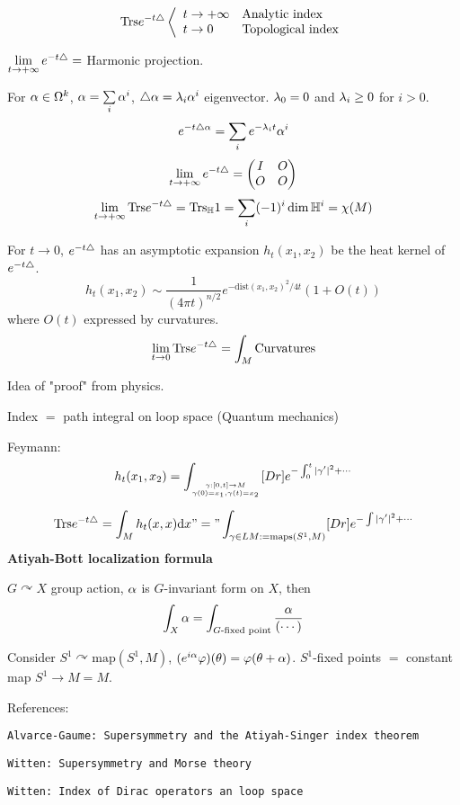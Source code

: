 $$
  \text{Trs} e^{-t\triangle}
  \left\langle
    \begin{array}{ll}
      t\to+\infty  &  \text{Analytic index}\\
      t\to 0       &  \text{Topological index}
    \end{array}
  \right.
$$

$\lim\limits_{t\to+\infty}e^{-t\triangle}=$ Harmonic projection.

For $\alpha\in\Omega^k$,
$\alpha=\sum\limits_i\alpha^i$, $\triangle\alpha=\lambda_i\alpha^i$ eigenvector.
$\lambda_0=0$ and $\lambda_i\geq 0$ for $i>0$.
$$e^{-t\triangle\alpha}=\sum_ie^{-\lambda_i t}\alpha^i$$
$$
  \lim_{t\to+\infty}
  e^{-t\triangle}
=
  \begin{pmatrix}
    I & O \\
    O & O
  \end{pmatrix}
$$
$$
  \lim_{t\to+\infty}
  \text{Trs}e^{-t\triangle}
=
  \text{Trs}_{\mathbb{H}}1
=\sum_i(-1)^i\dim\mathbb{H}^i=\chi(M)
$$

For $t\to 0$, $e^{-t\triangle}$ has an asymptotic expansion
$h_t(x_1,x_2)$ be the heat kernel of $e^{-t\triangle}$.
$$h_t(x_1,x_2)\sim\frac{1}{(4\pi t)^{n/2}}e^{-\text{dist}(x_1,x_2)^2/4t}
(1+O(t))$$
where $O(t)$ expressed by curvatures.
$$
  \lim_{t\to 0}
    \text{Trs} e^{-t\triangle}
=
  \int_M
    \text{Curvatures}
$$

Idea of "proof" from physics.

Index $=$ path integral on loop space (Quantum mechanics)

Feymann: 
$$
  h_t(x_1,x_2)
=
  \int_{\gamma:[0,t]\to M\atop \gamma(0)=x_1,\gamma(t)=x_2}
    [Dr]e^{-\int_{0}^{t}|\gamma'|^2+\cdots}
$$ 

$$
  \text{Trs} e^{-t\triangle}
=
  \int_M h_t(x,x)\mathrm{d} x
"="
  \int_{\gamma\in LM:=\text{maps}(S^1,M)}
    [Dr]
    e^{-\int |\gamma'|^2+\cdots}
$$
\textbf{Atiyah-Bott localization formula}

$G\curvearrowright X$ group action, 
$\alpha$ is $G$-invariant form on $X$, then
$$
  \int_X\alpha
=
  \int_{G\text{-fixed point}}
    \frac{\alpha}{(\cdots)}
$$

Consider $S^1\curvearrowright\text{map}(S^1,M)$,
$(e^{i\alpha}\varphi)(\theta)=\varphi(\theta+\alpha)$. 
$S^1$-fixed points $=$ constant map $S^1\to M=M$.

References:

\verb"Alvarce-Gaume: Supersymmetry and the Atiyah-Singer index theorem"

\verb"Witten: Supersymmetry and Morse theory"

\verb"Witten: Index of Dirac operators an loop space"

